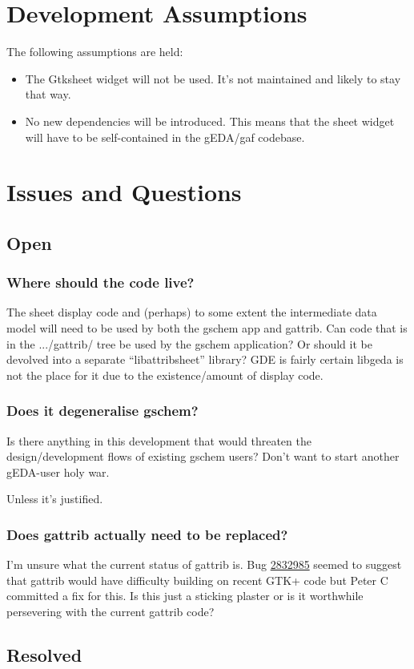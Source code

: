 \documentclass[a4,10pt]{article}
\begin{document}
\section{Development Assumptions}
The following assumptions are held:
\begin{itemize}

\item The Gtksheet widget will not be used. It's not maintained and likely to
  stay that way.

\item No new dependencies will be introduced. This means that the
  sheet widget will have to be self-contained in the gEDA/gaf
  codebase.

\end{itemize}
\section{Issues and Questions}
\subsection{Open}
%
\subsubsection{Where should the code live?}
The sheet display code and (perhaps) to some extent the intermediate
data model will need to be used by both the gschem app and
gattrib. Can code that is in the .../gattrib/ tree be used by the
gschem application? Or should it be devolved into a separate
``libattribsheet'' library? GDE is fairly certain libgeda is not the
place for it due to the existence/amount of display code.
%
\subsubsection{Does it degeneralise gschem?}
Is there anything in this development that would threaten the
design/development flows of existing gschem users? Don't want to start
another gEDA-user holy war.

Unless it's justified.
%
\subsubsection{Does gattrib actually need to be replaced?}
I'm unsure what the current status of gattrib is. Bug
\href{https://sourceforge.net/tracker/?func=detail&atid=818426&aid=2832985&group_id=161080}{2832985}
seemed to suggest that gattrib would have difficulty building on
recent GTK+ code but Peter C committed a fix for this. Is this just a
sticking plaster or is it worthwhile persevering with the current
gattrib code?
%
\subsection{Resolved}
\end{document}
